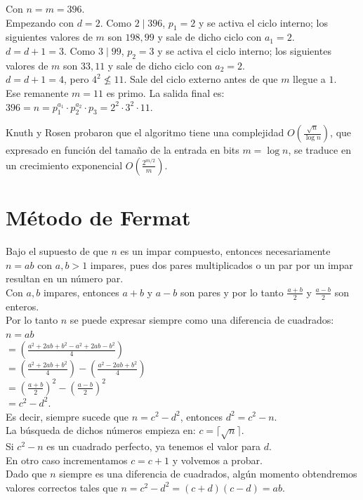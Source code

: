 \begin{ejemplo}
Con $n=m=396$. \\
Empezando con $d=2$. Como $2 \mid 396$, $p_1=2$ y se activa el ciclo interno; los siguientes valores de $m$ son $198, 99$ y sale de dicho ciclo con $a_1=2$. \\
$d=d+1=3$. Como $3 \mid 99$, $p_2=3$ y se activa el ciclo interno; los siguientes valores de $m$ son $33,11$ y sale de dicho ciclo con $a_2=2$. \\
$d=d+1=4$, pero $4^2 \nleq 11$. Sale del ciclo externo antes de que $m$ llegue a $1$. \\
Ese remanente $m=11$ es primo. La salida final es: \\
$396=n=p_1^{a_1} \cdot p_2^{a_2} \cdot p_3=2^2 \cdot 3^2 \cdot 11$.
\end{ejemplo}

Knuth y Rosen \cite{KnuthP76} probaron que el algoritmo tiene una complejidad $O\left(\frac{\sqrt{n}}{\log n}\right)$, que expresado en función del tamaño de la entrada en bits $m = \log n$, se traduce en un crecimiento exponencial $O\left( \frac{2^{m/2}}{m} \right)$.

\section{Método de Fermat}
\label{sec:metodoDeFermat}
Bajo el supuesto de que $n$ es un impar compuesto, entonces necesariamente $n=ab$ con $a,b > 1$ impares, pues dos pares multiplicados o un par por un impar resultan en un número par. \\
Con $a,b$ impares, entonces $a+b$ y $a-b$ son pares y por lo tanto $\frac{a+b}{2}$ y  $\frac{a-b}{2}$ son enteros. \\
Por lo tanto $n$ se puede expresar siempre como una diferencia de cuadrados: \\
$n = ab$ \\
$= (\frac{a^2+2ab+b^2 -a^2+2ab-b^2}{4})$ \\
$= (\frac{a^2+2ab+b^2}{4}) - (\frac{a^2-2ab+b^2}{4})$ \\
$= (\frac{a+b}{2})^2 - (\frac{a-b}{2})^2$ \\
$= c^2 - d^2$. \\

Es decir, siempre sucede que $n=c^2 - d^2$, entonces $d^2 = c^2 - n$. \\
La búsqueda de dichos números empieza en: $c = \lceil \sqrt{n} \rceil$. \\
Si $c^2 - n$ es un cuadrado perfecto, ya tenemos el valor para $d$. \\
En otro caso incrementamos $c=c+1$ y volvemos a probar. \\
Dado que $n$ siempre es una diferencia de cuadrados, algún momento obtendremos valores correctos tales que $n=c^2 - d^2 = (c+d)(c-d) = ab$.

